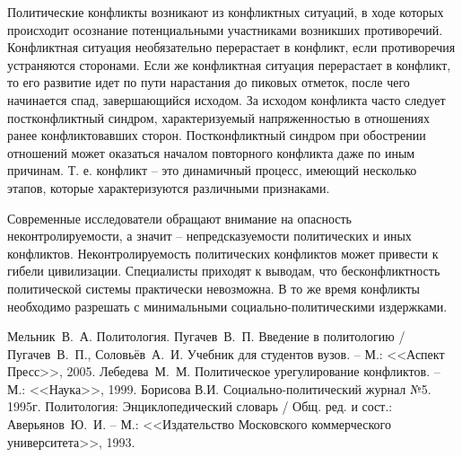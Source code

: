 Политические конфликты возникают из конфликтных ситуаций, в ходе которых
происходит осознание потенциальными участниками возникших противоречий.
Конфликтная ситуация необязательно перерастает в конфликт, если противоречия
устраняются сторонами. Если же конфликтная ситуация перерастает в конфликт, то
его развитие идет по пути нарастания до пиковых отметок, после чего начинается
спад, завершающийся исходом. За исходом конфликта часто следует постконфликтный
синдром, характеризуемый напряженностью в отношениях ранее конфликтовавших
сторон. Постконфликтный синдром при обострении отношений может оказаться
началом повторного конфликта даже по иным причинам. Т. е. конфликт -- это
динамичный процесс, имеющий несколько этапов, которые характеризуются
различными признаками.

Современные исследователи обращают внимание на опасность неконтролируемости, а
значит -- непредсказуемости политических и иных конфликтов. Неконтролируемость
политических конфликтов может привести к гибели цивилизации. Специалисты
приходят к выводам, что бесконфликтность политической системы практически
невозможна. В то же время конфликты необходимо разрешать с минимальными
социально-политическими издержками.

\newpage %
\renewcommand{\bibname}{Список литературы}

\begin{thebibliography}{9} 
     Мельник~В.~А. Политология.
     Пугачев~В.~П. Введение в политологию / Пугачев~В.~П.,
    Соловьёв~А.~И. Учебник для студентов вузов. -- М.: <<Аспект Пресс>>, 2005.
     Лебедева~М.~М. Политическое урегулирование конфликтов. -- М.:
    <<Наука>>, 1999.
     Борисова В.И. Социально-политический журнал №5. 1995г. 
     Политология: Энциклопедический словарь / Общ. ред. и сост.:
    Аверьянов~Ю.~И. -- М.: <<Издательство Московского коммерческого
    университета>>, 1993.
\end{thebibliography}